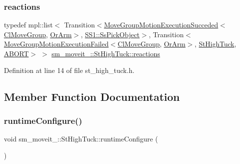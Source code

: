 \subsubsection{\texorpdfstring{reactions}{reactions}}
{\footnotesize\ttfamily typedef mpl\+::list$<$ Transition$<$\hyperlink{structmove__group__interface__client_1_1MoveGroupMotionExecutionSucceded}{Move\+Group\+Motion\+Execution\+Succeded}$<$\hyperlink{classmove__group__interface__client_1_1ClMoveGroup}{Cl\+Move\+Group}, \hyperlink{classsm__moveit__3_1_1OrArm}{Or\+Arm}$>$, \hyperlink{structsm__moveit__3_1_1SS1_1_1SsPickObject}{S\+S1\+::\+Ss\+Pick\+Object}$>$, Transition$<$\hyperlink{structmove__group__interface__client_1_1MoveGroupMotionExecutionFailed}{Move\+Group\+Motion\+Execution\+Failed}$<$\hyperlink{classmove__group__interface__client_1_1ClMoveGroup}{Cl\+Move\+Group}, \hyperlink{classsm__moveit__3_1_1OrArm}{Or\+Arm}$>$, \hyperlink{structsm__moveit__3_1_1StHighTuck}{St\+High\+Tuck}, \hyperlink{classABORT}{A\+B\+O\+RT}$>$ $>$ \hyperlink{structsm__moveit__3_1_1StHighTuck_a14e727ee48019a59fb9f27737fb57a7e}{sm\+\_\+moveit\+\_\+::\+St\+High\+Tuck\+::reactions}}



Definition at line 14 of file st\+\_\+high\+\_\+tuck.\+h.



\subsection{Member Function Documentation}
\mbox{\label{structsm__moveit__3_1_1StHighTuck_a9a247958dbc1a1ab3ef0a287f6688218}} 
\subsubsection{\texorpdfstring{runtime\+Configure()}{runtimeConfigure()}}
{\footnotesize\ttfamily void sm\+\_\+moveit\+\_\+::\+St\+High\+Tuck\+::runtime\+Configure (\begin{DoxyParamCaption}{ }\end{DoxyParamCaption})\hspace{0.3cm}{\ttfamily [inline]}}



